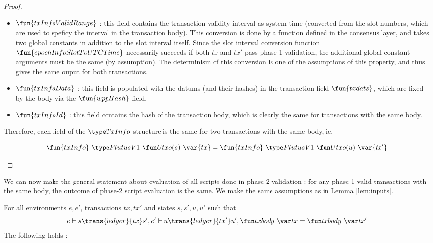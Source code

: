 \begin{property}
\begin{proof}
\begin{itemize}
\begin{itemize}
        \item $\fun{txInfoValidRange}$ : this field contains the transaction
        validity interval as system time (converted from the slot numbers, which are
        used to speficy the interval in the transaction body). This conversion is
        done by a function defined in the consensus layer, and takes two global
        constants in addition to the slot interval itself. Since the slot interval
        conversion function $\fun{epochInfoSlotToUTCTime}$ necessarily
        succeeds if both $tx$ and $tx'$ pass phase-1 validation, the additional
        global constant arguments must be the same (by assumption). The determinism of this conversion
        is one of the assumptions of this property, and thus gives the same ouput
        for both transactions.

        \item $\fun{txInfoData}$ : this field is populated with the datums (and their
        hashes) in the transaction field $\fun{txdats}$, which are fixed by the body
        via the $\fun{wppHash}$ field.

        \item $\fun{txInfoId}$ : this field contains the hash of the transaction body,
        which is clearly the same for transactions with the same body.
      \end{itemize}

      Therefore, each field of the $\TxInfo$ structure is
      the same for two transactions with the same body, ie.

      \[ \fun{txInfo}~\PlutusVI~\Utxo(s)~\var{tx} = \fun{txInfo}~\PlutusVI~\Utxo(u)~\var{tx'}\]

    \end{itemize}
\end{proof}

We can now make the general statement about evaluation of all scripts done in
phase-2 validation : for any phase-1 valid transactions with the same body,
the outcome of phase-2 script evaluation is the same. We make the same assumptions
as in Lemma \ref{lem:inputs}.

\begin{corollary}
  For all environments $e, e'$, transactions $tx, tx'$ and states $s, s', u, u'$ such that
  \begin{equation*}
    e\vdash s\trans{ledger}{tx}s', \\
    e'\vdash u\trans{ledger}{tx'}u', \\
    \txbody{tx} = \txbody{tx'}
  \end{equation*}
  The following holds :


\end{corollary}
\end{property}
